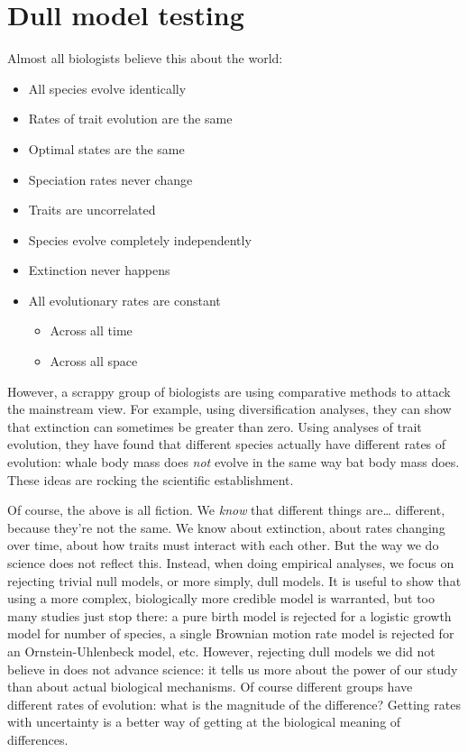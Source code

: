 \documentclass[]{book}
\providecommand{\tightlist}{%
  \setlength{\itemsep}{0pt}\setlength{\parskip}{0pt}}
\theoremstyle{definition}
\theoremstyle{definition}
\theoremstyle{remark}
\begin{document}
\hypertarget{dull-model-testing}{\chapter{Dull model
testing}\label{dull-model-testing}}

Almost all biologists believe this about the world:

\begin{itemize}
\tightlist
\item
  All species evolve identically
\item
  Rates of trait evolution are the same
\item
  Optimal states are the same
\item
  Speciation rates never change
\item
  Traits are uncorrelated
\item
  Species evolve completely independently
\item
  Extinction never happens
\item
  All evolutionary rates are constant

  \begin{itemize}
  \tightlist
  \item
    Across all time
  \item
    Across all space
  \end{itemize}
\end{itemize}

However, a scrappy group of biologists are using comparative methods to
attack the mainstream view. For example, using diversification analyses,
they can show that extinction can sometimes be greater than zero. Using
analyses of trait evolution, they have found that different species
actually have different rates of evolution: whale body mass does
\emph{not} evolve in the same way bat body mass does. These ideas are
rocking the scientific establishment.

Of course, the above is all fiction. We \emph{know} that different
things are\ldots{} different, because they're not the same. We know
about extinction, about rates changing over time, about how traits must
interact with each other. But the way we do science does not reflect
this. Instead, when doing empirical analyses, we focus on rejecting
trivial null models, or more simply, dull models. It is useful to show
that using a more complex, biologically more credible model is
warranted, but too many studies just stop there: a pure birth model is
rejected for a logistic growth model for number of species, a single
Brownian motion rate model is rejected for an Ornstein-Uhlenbeck model,
etc. However, rejecting dull models we did not believe in does not
advance science: it tells us more about the power of our study than
about actual biological mechanisms. Of course different groups have
different rates of evolution: what is the magnitude of the difference?
Getting rates with uncertainty is a better way of getting at the
biological meaning of differences.
\end{document}
